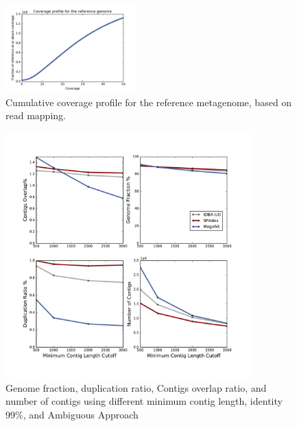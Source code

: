\documentclass[10pt,a4paper,twocolumn]{article}
\begin{document}

 
\begin{figure}[!h]
\centering
\includegraphics[width=0.45\textwidth]{CoverageProfile.pdf}  
\caption{\label{fig:coverage-profile} Cumulative coverage profile for the reference metagenome, based on read mapping. }
\end{figure}


\begin{figure}[!ht]
\centering
\includegraphics[width=9.5cm,height=9.5cm]{min-contig-analysis.pdf}  
\caption{\label{fig:min-contig-analysis} Genome fraction, duplication ratio, Contigs overlap ratio, and number of contigs using different minimum contig length,  identity 99\%, and Ambiguous Approach}
\end{figure}
\end{document}
